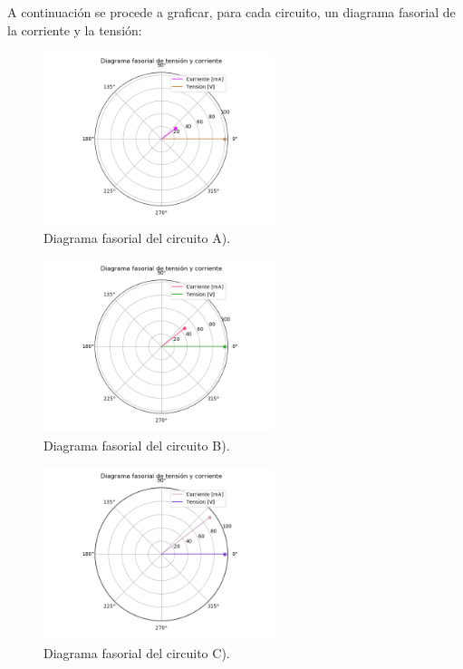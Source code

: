 \documentclass[a4paper]{article}
\begin{document}
A continuación se procede a graficar, para cada circuito, un diagrama fasorial de la corriente y la tensión:

\begin{figure}[H]
	\centering
	\includegraphics[width=0.6\textwidth]{Fasorial-1A.png}
	\caption{Diagrama fasorial del circuito A).}
	\label{fig:faso-1a}
\end{figure}

\begin{figure}[H]
	\centering
	\includegraphics[width=0.6\textwidth]{Fasorial-1B.png}
	\caption{Diagrama fasorial del circuito B).}
	\label{fig:faso-1b}
\end{figure}

\begin{figure}[H]
	\centering
	\includegraphics[width=0.6\textwidth]{Fasorial-1C.png}
	\caption{Diagrama fasorial del circuito C).}
	\label{fig:faso-1c}
\end{figure}
\end{document}
